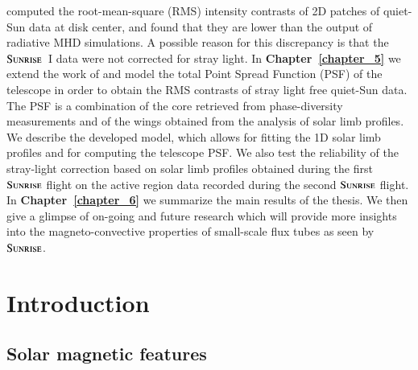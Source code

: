 \documentclass[goettingen, gauss, print]{thesis}
\begin{document}
\cite{hirzberger_quiet-sun_2010} computed the root-mean-square (RMS) intensity contrasts of 2D patches of quiet-Sun data at disk center, and found that they are lower than the output of radiative MHD simulations. A possible reason for this discrepancy is that the $\textsc{Sunrise}$~I data were not corrected for stray light. %
In \textbf{Chapter~\ref{chapter_5}} we extend the work of \cite{hirzberger_quiet-sun_2010} and model the total Point Spread Function (PSF) of the telescope in order to obtain the RMS contrasts of stray light free quiet-Sun data. The PSF is a combination of the core retrieved from phase-diversity measurements and of the wings obtained from the analysis of solar limb profiles. We describe the developed model, which allows for fitting the 1D solar limb profiles and for computing the telescope PSF. We also test the reliability of the stray-light correction based on solar limb profiles obtained during the first $\textsc{Sunrise}$ flight on the active region data recorded during the second $\textsc{Sunrise}$ flight.\\

In \textbf{Chapter~\ref{chapter_6}} we summarize the main results of the thesis. We then give a glimpse of on-going and future research which will provide more insights into the magneto-convective properties of small-scale flux tubes as seen by $\textsc{Sunrise}$.



\chapter{Introduction}
\label{chapter_1}


\section{Solar magnetic features}
\label{intro-features}
\end{document}
